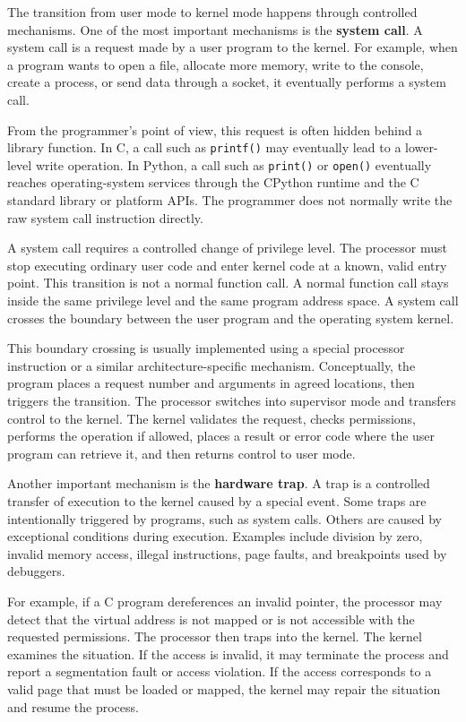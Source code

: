 \documentclass[a4paper,twoside]{report}
\begin{document}
The transition from user mode to kernel mode happens through controlled mechanisms. One of the most important mechanisms is the \textbf{system call}. A system call is a request made by a user program to the kernel. For example, when a program wants to open a file, allocate more memory, write to the console, create a process, or send data through a socket, it eventually performs a system call.

From the programmer's point of view, this request is often hidden behind a library function. In C, a call such as \texttt{printf()} may eventually lead to a lower-level write operation. In Python, a call such as \texttt{print()} or \texttt{open()} eventually reaches operating-system services through the CPython runtime and the C standard library or platform APIs. The programmer does not normally write the raw system call instruction directly.

A system call requires a controlled change of privilege level. The processor must stop executing ordinary user code and enter kernel code at a known, valid entry point. This transition is not a normal function call. A normal function call stays inside the same privilege level and the same program address space. A system call crosses the boundary between the user program and the operating system kernel.

This boundary crossing is usually implemented using a special processor instruction or a similar architecture-specific mechanism. Conceptually, the program places a request number and arguments in agreed locations, then triggers the transition. The processor switches into supervisor mode and transfers control to the kernel. The kernel validates the request, checks permissions, performs the operation if allowed, places a result or error code where the user program can retrieve it, and then returns control to user mode.

Another important mechanism is the \textbf{hardware trap}. A trap is a controlled transfer of execution to the kernel caused by a special event. Some traps are intentionally triggered by programs, such as system calls. Others are caused by exceptional conditions during execution. Examples include division by zero, invalid memory access, illegal instructions, page faults, and breakpoints used by debuggers.

For example, if a C program dereferences an invalid pointer, the processor may detect that the virtual address is not mapped or is not accessible with the requested permissions. The processor then traps into the kernel. The kernel examines the situation. If the access is invalid, it may terminate the process and report a segmentation fault or access violation. If the access corresponds to a valid page that must be loaded or mapped, the kernel may repair the situation and resume the process.
\end{document}
